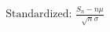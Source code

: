 \documentclass[preview]{standalone}
\begin{document}
\begin{align*}
\text{Standardized: } \frac{S_n - n\mu}{\sqrt{n}\sigma}
\end{align*}
\end{document}
